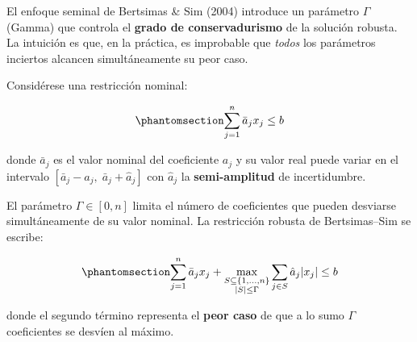 \documentclass[
  spanish,
  11pt,
  letterpaper,
]{scrbook}
\theoremstyle{plain}
\theoremstyle{remark}
\begin{document}
El enfoque seminal de Bertsimas \& Sim (2004) introduce un parámetro
\(\Gamma\) (Gamma) que controla el \textbf{grado de conservadurismo} de
la solución robusta. La intuición es que, en la práctica, es improbable
que \emph{todos} los parámetros inciertos alcancen simultáneamente su
peor caso.

Considérese una restricción nominal:

\begin{equation}\protect\phantomsection\label{eq-nominal-constraint}{
\sum_{j=1}^{n} \bar{a}_j x_j \leq b
}\end{equation}

donde \(\bar{a}_j\) es el valor nominal del coeficiente \(a_j\) y su
valor real puede variar en el intervalo
\([\bar{a}_j - \hat{a}_j, \; \bar{a}_j + \hat{a}_j]\) con \(\hat{a}_j\)
la \textbf{semi-amplitud} de incertidumbre.

El parámetro \(\Gamma \in [0, n]\) limita el número de coeficientes que
pueden desviarse simultáneamente de su valor nominal. La restricción
robusta de Bertsimas--Sim se escribe:

\begin{equation}\protect\phantomsection\label{eq-bertsimas-sim}{
\sum_{j=1}^{n} \bar{a}_j x_j + \max_{\substack{S \subseteq \{1,\ldots,n\} \\ |S| \leq \Gamma}} \sum_{j \in S} \hat{a}_j |x_j| \leq b
}\end{equation}

donde el segundo término representa el \textbf{peor caso} de que a lo
sumo \(\Gamma\) coeficientes se desvíen al máximo.
\end{document}
